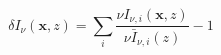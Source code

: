\begin{equation}
  \delta I_{\nu} \left(\textbf{x}, z \right) = \sum_i \frac{\nu I_{\nu, i} \left(\textbf{x}, z \right)}{\nu \bar{I}_{\nu, i} \left(z \right)} - 1
\end{equation}
